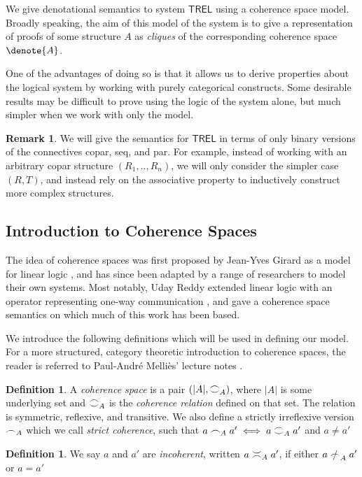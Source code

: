\documentclass[11pt, oneside]{article}
\theoremstyle{plain}
\theoremstyle{definition}
\newtheorem{definition}[theorem]{Definition}
\newtheorem*{remark}{Remark}
\DeclarePairedDelimiter\denote\llbracket\rrbracket
\newcommand{\sSys}{{\mathsf{TREL}}}%
\newcommand{\coh}[1][]{\mathrel{\vcenter{\offinterlineskip\hbox{$\frown$}\vskip0.2ex\hbox{$\smile$}}_{\ifx\\#1\\\else#1\fi}}}
\newcommand{\incoh}[1][]{\mathrel{\vcenter{\offinterlineskip\hbox{$\smile$}\vskip0.2ex\hbox{$\frown$}}_{\ifx\\#1\\\else#1\fi}}}
\newcommand{\scoh}[1][]{\mathrel{\frown}_{\ifx\\#1\\\else#1\fi}}
\newcommand{\notscoh}[1][]{\mathrel{\ooalign{$\frown$\cr\hidewidth$/$\hidewidth}}_{\ifx\\#1\\\else#1\fi}}
\begin{document}
We give denotational semantics to system $\sSys$ using a coherence space model.
Broadly speaking, the aim of this model of the system is to give a representation of proofs of some structure $A$ as \textit{cliques} of the corresponding coherence space $\denote{A}$.

One of the advantages of doing so is that it allows us to derive properties about the logical system by working with purely categorical constructs.
Some desirable results may be difficult to prove using the logic of the system alone, but much simpler when we work with only the model.

\begin{remark}
We will give the semantics for $\sSys$ in terms of only binary versions of the connectives copar, seq, and par.
For example, instead of working with an arbitrary copar structure $(R_1,..,R_n)$, we will only consider the simpler case $(R,T)$, and instead rely on the associative property to inductively construct more complex structures.
\end{remark}

\subsection{Introduction to Coherence Spaces}
The idea of coherence spaces was first proposed by Jean-Yves Girard as a model for linear logic \cite{girard1987linear}, and has since been adapted by a range of researchers to model their own systems.
Most notably, Uday Reddy extended linear logic with an operator representing one-way communication \cite{reddy1993all}, and gave a coherence space semantics on which much of this work has been based.

We introduce the following definitions which will be used in defining our model.
For a more structured, category theoretic introduction to coherence spaces, the reader is referred to Paul-André Melliès' lecture notes \cite{mellies2000survival}.

\begin{definition}
    A \textit{coherence space} is a pair $(|A|,\coh[A])$, where $|A|$ is some underlying set and $\coh[A]$ is the \textit{coherence relation} defined on that set.
    The relation is symmetric, reflexive, and transitive.
    We also define a strictly irreflexive version $\scoh[A]$ which we call \textit{strict coherence}, such that $a\scoh[A]a' \iff a\coh[A]a'$ and $a\not=a'$
\end{definition}

\begin{definition}
    We say $a$ and $a'$ are \textit{incoherent}, written $a \incoh[A] a'$, if either $a \notscoh[A] a'$ or $a=a'$
\end{definition}
\end{document}
